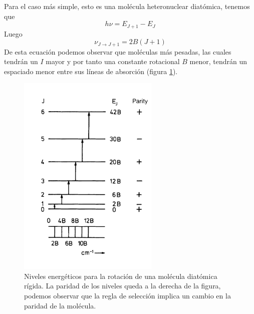 \documentclass[a4paper]{article}
\begin{document}
Para el caso más simple, esto es una molécula heteronuclear diatómica, tenemos que 
\begin{equation}
h\nu = E_{J+1}-E_{J}
\end{equation}
Luego
\begin{equation}
\nu_{J \rightarrow J+1} = 2B(J+1)
\end{equation}
De esta ecuación podemos observar que moléculas más pesadas, las cuales tendrán un $I$ mayor y por tanto una constante rotacional $B$ menor, tendrán un espaciado menor entre sus líneas de absorción (figura \ref{niveles1}).
\begin{figure}
\includegraphics[width=0.6\textwidth]{niveles1.png}
\caption{Niveles energéticos para la rotación de una molécula diatómica rígida. La paridad de los niveles queda a la derecha de la figura, podemos observar que la regla de selección implica un cambio en la paridad de la molécula.}
\label{niveles1}
\end{figure}
\\
\end{document}
